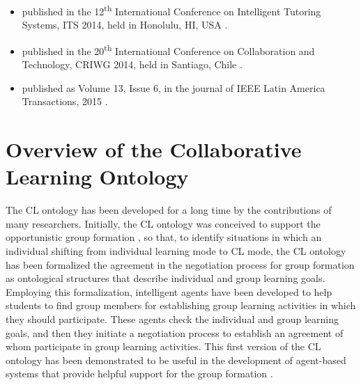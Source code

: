 \begin{itemize}
\item
{} published in the 12\textsuperscript{th} International Conference on Intelligent Tutoring Systems, ITS 2014, held in Honolulu, HI, USA \cite{ChallcoMoreiraMizoguchiIsotani2014a}.

\item
{} published in the 20\textsuperscript{th} International Conference on Collaboration and Technology, CRIWG 2014, held in Santiago, Chile \cite{ChallcoMoreiraMizoguchiIsotani2014}.

\item
{} published as Volume 13, Issue 6, in the journal of IEEE Latin America Transactions, 2015 \cite{ChallcoMoreiraBittencourtMizoguchiIsotani2015}.
\end{itemize}


\section{Overview of the Collaborative Learning Ontology}
\label{sec:overview-of-cl-ontology}

The CL ontology has been developed for a long time by the contributions of many researchers. Initially, the CL ontology was conceived to support the opportunistic group formation \cite{IkedaGoMizoguchi1997}, so that, to identify situations in which an individual shifting from individual learning mode to CL mode, the CL ontology has been formalized the agreement in the negotiation process for group formation as ontological structures that describe individual and group learning goals. Employing this formalization, intelligent agents have been developed to help students to find group members for establishing group learning activities in which they should participate. These agents check the individual and group learning goals, and then they initiate a negotiation process to establish an agreement of whom participate in group learning activities. This first version of the CL ontology has been demonstrated to be useful in the development of agent-based systems that provide helpful support for the group formation \cite{InabaOhkuboIkedaMizoguchiToyoda2001, SupnithiInabaIkedaMizoguchi1999}.

